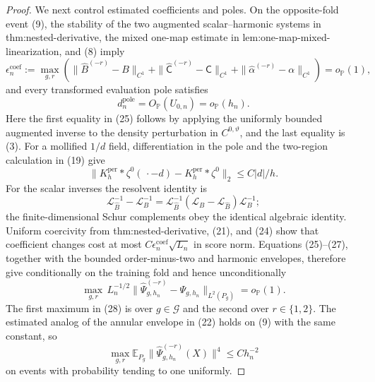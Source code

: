 \documentclass{article}
\begin{document}
\begin{proof}
We next control estimated coefficients and poles.  On the opposite-fold event (9), the stability of the two augmented scalar--harmonic systems in thm:nested-derivative, the mixed one-map estimate in lem:one-map-mixed-linearization, and (8) imply
\[
 \epsilon_n^{\mathrm{coef}}
 :=\max_{g,r}\left(
 \|\widehat B^{(-r)}-B\|_{C^1}
 +\|\widehat{\mathsf C}^{(-r)}-\mathsf C\|_{C^1}
 +\|\widehat\alpha^{(-r)}-\alpha\|_{C^1}
 \right)=o_{\mathbb P}(1),
\tag{24}
\]
and every transformed evaluation pole satisfies
\[
 d_n^{\mathrm{pole}}=O_{\mathbb P}(U_{0,n})=o_{\mathbb P}(h_n).
\tag{25}
\]
Here the first equality in (25) follows by applying the uniformly bounded augmented inverse to the density perturbation in \(C^{0,\vartheta}\), and the last equality is (3).  For a mollified \(1/d\) field, differentiation in the pole and the two-region calculation in (19) give
\[
 \|K_h^{\mathrm{per}}*\zeta^0(\,\cdot-d)
       -K_h^{\mathrm{per}}*\zeta^0\|_2
 \leq C|d|/h.
\tag{26}
\]
For the scalar inverses the resolvent identity is
\[
 \mathcal L_{\widehat B}^{-1}-\mathcal L_B^{-1}
 =\mathcal L_{\widehat B}^{-1}
   (\mathcal L_B-\mathcal L_{\widehat B})\mathcal L_B^{-1};
\tag{27}
\]
the finite-dimensional Schur complements obey the identical algebraic identity.  Uniform coercivity from thm:nested-derivative, (21), and (24) show that coefficient changes cost at most
\(C\epsilon_n^{\mathrm{coef}}\sqrt{L_n}\) in score norm.  Equations (25)--(27), together with the bounded order-minus-two and harmonic envelopes, therefore give conditionally on the training fold and hence unconditionally
\[
 \max_{g,r}\,L_n^{-1/2}
 \|\widehat\Psi_{g,h_n}^{(-r)}-\Psi_{g,h_n}\|_{L^2(P_g)}
 =o_{\mathbb P}(1).
\tag{28}
\]
The first maximum in (28) is over \(g\in\mathcal G\) and the second over
\(r\in\{1,2\}\).  The estimated analog of the annular envelope in (22) holds on (9) with the same constant, so
\[
 \max_{g,r}\mathbb E_{P_g}
 \|\widehat\Psi_{g,h_n}^{(-r)}(X)\|^4\leq Ch_n^{-2}
\tag{29}
\]
on events with probability tending to one uniformly.


\end{proof}
\end{document}
